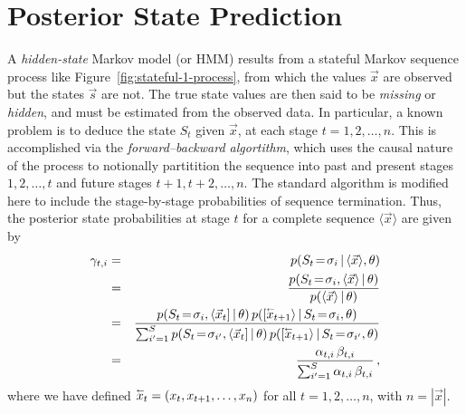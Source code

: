 \documentclass[a4paper]{article}
\newcommand{\rvec}[1]{\accentset{\leftarrow}{#1}}
\begin{document}
\section{Posterior State Prediction}

A {\em hidden-state} Markov model (or HMM) results from a stateful Markov sequence process like Figure~\ref{fig:stateful-1-process}, from which the values $\vec{x}$ are observed
but the states $\vec{s}$ are not. The true state values are then said to be {\em missing} or {\em hidden}, and must be estimated from the observed data.
In particular, a known problem is to deduce the state $S_t$ given $\vec{x}$, at each stage $t=1,2,\ldots,n$. This is accomplished
via the {\em forward--backward algortithm}, which uses the causal nature of the process to notionally partitition the sequence into past and present stages $1,2,\ldots,t$ and future stages $t+1,t+2,\ldots,n$.
The standard algorithm is modified here to include the stage-by-stage probabilities of sequence termination.
Thus, the posterior state probabilities at stage $t$ for a complete sequence $\langle\vec{x}\rangle$ are given by
\begin{eqnarray}
   \gamma_{t,i} & = & p(S_t\!=\!\sigma_i\,|\,\langle\vec{x}\rangle,\theta)
\nonumber\\& = &
   \frac{p(S_t\!=\!\sigma_i,\langle\vec{x}\rangle\,|\,\theta)}
        {p(\langle\vec{x}\rangle\,|\,\theta)}
\nonumber\\& = &
   \frac{p(S_t\!=\!\sigma_i,\langle\vec{x}_t]\,|\,\theta)\,p([\rvec{x}_{t+1}\rangle\,|\,S_t\!=\!\sigma_i,\theta)}
        {\sum_{i'=1}^{S}p(S_t\!=\!\sigma_{i'},\langle\vec{x}_t]\,|\,\theta)\,p([\rvec{x}_{t+1}\rangle\,|\,S_t\!=\!\sigma_{i'},\theta)}
\nonumber\\& = &
   \frac{\alpha_{t,i}\,\beta_{t,i}}
        {\sum_{i'=1}^{S}\alpha_{t,i}\,\beta_{t,i}}
\,,
\label{eq:gamma_t_i}
\end{eqnarray}
where we have defined $\rvec{x}_{t}=(x_t,x_{t+1},\ldots,x_n)$ for all $t=1,2,\ldots,n$, with $n=|\vec{x}|$.
\end{document}

